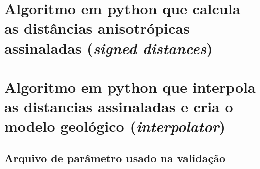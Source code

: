 \documentclass[
	12pt,				%
	openright,			%
	twoside,			%
	a4paper,			%
	english,			%
	french,				%
	spanish,			%
	brazil				%
	]{abntex2}
\begin{document}
%
%


\begin{apendicesenv}

\partapendices

\chapter{Algoritmo em python que calcula as distâncias anisotrópicas assinaladas (\textit{signed distances})}\label{apendicea}



\chapter{Algoritmo em python que interpola as distancias assinaladas e cria o modelo geológico (\textit{interpolator})}\label{apendiceb}



\end{apendicesenv}



\begin{anexosenv}
%
\partanexos
%
\chapter{Arquivo de parâmetro usado na validação}\label{anexo}

%
%
%
%
%
\end{anexosenv}

\end{document}
